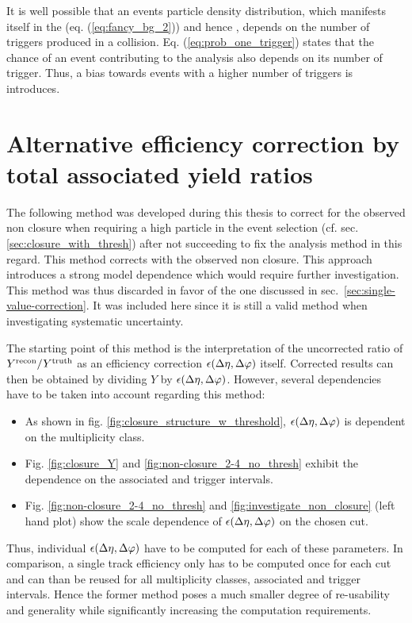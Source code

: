It is well possible that an events particle density distribution, which manifests itself in the \B (eq. (\ref{eq:fancy_bg_2})) and hence \Sig, depends on the number of triggers produced in a collision. Eq. (\ref{eq:prob_one_trigger}) states that the chance of an event contributing to the analysis also depends on its number of trigger. Thus, a bias towards events with a higher number of triggers is introduces.



\section{Alternative efficiency correction by total associated yield ratios}
\label{sec:2D_correction}
The following method was developed during this thesis to correct for the observed non closure when requiring a high \pt particle in the event selection (cf. sec. \ref{sec:closure_with_thresh}) after not succeeding to fix the analysis method in this regard. This method corrects \Y with the observed non closure. This approach introduces a strong model dependence which would require further investigation. This method was thus discarded in favor of the one discussed in sec.~\ref{sec:single-value-correction}. It was included here since it is still a valid method when investigating systematic uncertainty.

The starting point of this method is the interpretation of the uncorrected ratio of $Y^{\text{recon}} / Y^{\text{truth}}$ as an efficiency correction $\epsilon(\Delta\eta, \Delta\varphi)$ itself. Corrected results can then be obtained by dividing $Y$  by $\epsilon(\Delta\eta, \Delta\varphi)$. However, several dependencies have to be taken into account regarding this method:

\begin{itemize}
\item As shown in fig. \ref{fig:closure_structure_w_threshold}, $\epsilon(\Delta\eta, \Delta\varphi)$ is dependent on the multiplicity class.
\item Fig. \ref{fig:closure_Y} and \ref{fig:non-closure_2-4_no_thresh} exhibit the dependence on the associated and trigger intervals.
\item Fig. \ref{fig:non-closure_2-4_no_thresh} and \ref{fig:investigate_non_closure} (left hand plot) show the scale dependence of $\epsilon(\Delta\eta, \Delta\varphi)$ on the chosen cut.
\end{itemize}

Thus, individual $\epsilon(\Delta\eta, \Delta\varphi)$ have to be computed for each of these parameters. In comparison, a single track efficiency only has to be computed once for each cut and can than be reused for all multiplicity classes, associated and trigger intervals. Hence the former method poses a much smaller degree of re-usability and generality while significantly increasing the computation requirements. 

